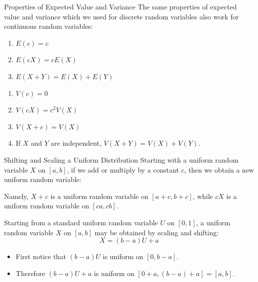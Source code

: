 \documentclass[handout]{beamer}
\begin{document}
\begin{frame}{Properties of Expected Value and Variance}
The same properties of expected value and variance which we used for discrete random variables also work for continuous random variables:
\begin{block}{}
\begin{enumerate}
\item $E(c) = c$
\item $E(cX) = cE(X)$
\item $E(X+Y) = E(X)+E(Y)$
\end{enumerate}
\end{block}

\begin{block}{}
\begin{enumerate}
\item $V(c) = 0$
\item $V(cX) = c^2V(X)$
\item $V(X+c) = V(X)$
\item If $X$ and $Y$ are independent, $V(X+Y)=V(X)+V(Y)$.
\end{enumerate}
\end{block}
\end{frame}

\begin{frame}{Shifting and Scaling a Uniform Distribution}
Starting with a uniform random variable $X$ on $[a,b]$, if we add or multiply by a constant $c$, then we obtain a new uniform random variable:

\vspace{.2cm}Namely, $X+c$ is a uniform random variable on $[a+c,b+c]$, while $cX$ is a uniform random variable on $[ca,cb]$.

\vspace{.2cm}\pause
Starting from a standard uniform random variable $U$ on $[0,1]$, a uniform random variable $X$ on $[a,b]$ may be obtained by scaling and shifting:
$$X=(b-a)U+a$$

\vspace{0cm}
\begin{itemize}
\item First notice that $(b-a)U$ is uniform on $[0,b-a]$.
\item Therefore $(b-a)U+a$ is uniform on $[0+a,(b-a)+a]=[a,b]$.
\end{itemize}
\end{frame}
\end{document}
